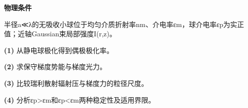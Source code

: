 \textbf{物理条件}\par 半径a≪λ的无吸收小球位于均匀介质折射率nm、介电率εm，球介电率εp为实正值；近轴Gaussian束局部强度I(r,z)。
\par\noindent\textbf{(1)} 从静电球极化得到偶极极化率。
\par\noindent\textbf{(2)} 求保守梯度势能与梯度光力。
\par\noindent\textbf{(3)} 比较瑞利散射辐射压与梯度力的粒径尺度。
\par\noindent\textbf{(4)} 分析εp>εm和εp<εm两种稳定性及适用界限。
